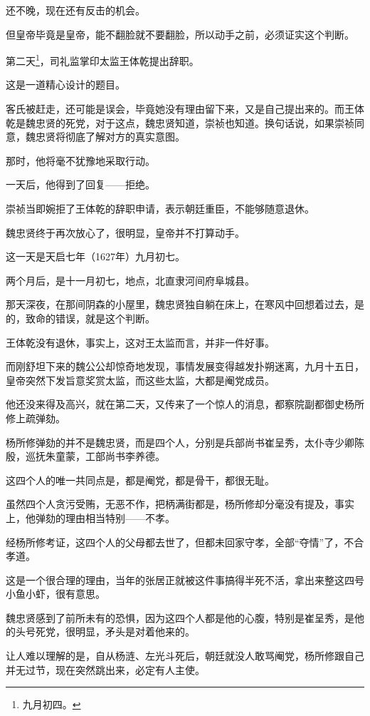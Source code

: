 \begin{multicols}{\theparacolNo}
		还不晚，现在还有反击的机会。

		但皇帝毕竟是皇帝，能不翻脸就不要翻脸，所以动手之前，必须证实这个判断。

		第二天\footnote{九月初四。}，司礼监掌印太监王体乾提出辞职。

		这是一道精心设计的题目。

		客氏被赶走，还可能是误会，毕竟她没有理由留下来，又是自己提出来的。而王体乾是魏忠贤的死党，对于这点，魏忠贤知道，崇祯也知道。换句话说，如果崇祯同意，魏忠贤将彻底了解对方的真实意图。

		那时，他将毫不犹豫地采取行动。

		一天后，他得到了回复——拒绝。

		崇祯当即婉拒了王体乾的辞职申请，表示朝廷重臣，不能够随意退休。

		魏忠贤终于再次放心了，很明显，皇帝并不打算动手。

		这一天是天启七年（1627年）九月初七。

		两个月后，是十一月初七，地点，北直隶河间府阜城县。

		那天深夜，在那间阴森的小屋里，魏忠贤独自躺在床上，在寒风中回想着过去，是的，致命的错误，就是这个判断。

		王体乾没有退休，事实上，这对王太监而言，并非一件好事。

		而刚舒坦下来的魏公公却惊奇地发现，事情发展变得越发扑朔迷离，九月十五日，皇帝突然下发旨意奖赏太监，而这些太监，大都是阉党成员。

		他还没来得及高兴，就在第二天，又传来了一个惊人的消息，都察院副都御史杨所修上疏弹劾。

		杨所修弹劾的并不是魏忠贤，而是四个人，分别是兵部尚书崔呈秀，太仆寺少卿陈殷，巡抚朱童蒙，工部尚书李养德。

		这四个人的唯一共同点是，都是阉党，都是骨干，都很无耻。

		虽然四个人贪污受贿，无恶不作，把柄满街都是，杨所修却分毫没有提及，事实上，他弹劾的理由相当特别——不孝。

		经杨所修考证，这四个人的父母都去世了，但都未回家守孝，全部“夺情”了，不合孝道。

		这是一个很合理的理由，当年的张居正就被这件事搞得半死不活，拿出来整这四号小鱼小虾，很有意思。

		魏忠贤感到了前所未有的恐惧，因为这四个人都是他的心腹，特别是崔呈秀，是他的头号死党，很明显，矛头是对着他来的。

		让人难以理解的是，自从杨涟、左光斗死后，朝廷就没人敢骂阉党，杨所修跟自己并无过节，现在突然跳出来，必定有人主使。


\end{multicols}
